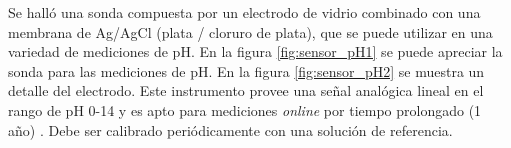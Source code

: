 Se halló una sonda compuesta por un electrodo de vidrio combinado con una membrana de Ag/AgCl (plata / cloruro de plata),  que se puede utilizar en una variedad de mediciones de pH. En la figura \ref{fig:sensor_pH1} se puede apreciar la sonda para las mediciones de pH. En la figura \ref{fig:sensor_pH2} se muestra un detalle del electrodo. Este instrumento provee una señal analógica lineal en el rango de pH 0-14 y es apto para mediciones \textit{online} por tiempo prolongado (1 año) \citep{sensor_pH}. Debe ser calibrado periódicamente con una solución de referencia.



\vspace{10px}

